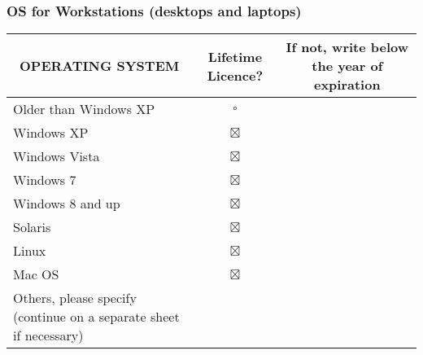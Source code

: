 \documentclass[a4paper,10pt, total={10.95in, 8in}]{article} %
\begin{document}
\subsubsection{OS for Workstations (desktops and laptops)}
\begin{table}[H]
\renewcommand{\arraystretch}{1.5}
\centering
\begin{adjustbox}{width=6.5in}
\begin{tabular}{|p{6.5cm}|c|l|}
\hline
\multicolumn{1}{|c|}{OPERATING SYSTEM}                             & Lifetime Licence? & \multicolumn{1}{c|}{If not, write below the year of expiration} \\ \hline
Older than Windows XP                                              & \Large$\square$       & \multicolumn{1}{c|}{\textbf{}}                                  \\ \hline
Windows XP                                                         & \Large$\boxtimes$       & \multicolumn{1}{c|}{\textbf{}}                                  \\ \hline
Windows Vista                                                      & \Large$\boxtimes$       & \multicolumn{1}{c|}{}                                           \\ \hline
Windows 7                                                          & \Large$\boxtimes$       & \multicolumn{1}{c|}{}                                           \\ \hline
Windows 8 and up                                                   & \Large$\boxtimes$       &                                                                 \\ \hline
Solaris                                                            & \Large$\boxtimes$       &                                                                 \\ \hline
Linux                                                              & \Large$\boxtimes$       &                                                                 \\ \hline
Mac OS                                                             & \Large$\boxtimes$       &                                                                 \\ \hline
Others, please specify (continue on a separate sheet if necessary) &       &                                                                 \\ \hline
\end{tabular}
\end{adjustbox}
\end{table}
\end{document}
